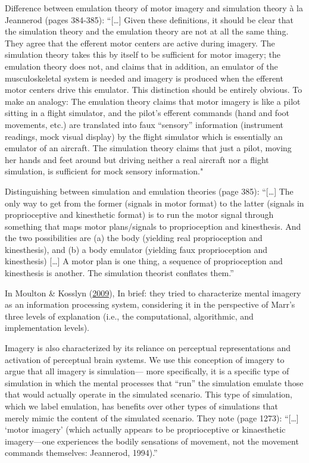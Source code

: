 \documentclass[a4paper,12pt,twoside,openright,oldfontcommands]{memoir}
\begin{document}
Difference between emulation theory of motor imagery and simulation theory à la Jeannerod (pages 384-385): \enquote{{[}\ldots{]} Given these definitions, it should be clear that the simulation theory and the emulation theory are not at all the same thing. They agree that the efferent motor centers are active during imagery. The simulation theory takes this by itself to be sufficient for motor imagery; the emulation theory does not, and claims that in addition, an emulator of the musculoskeletal system is needed and imagery is produced when the efferent motor centers drive this emulator. This distinction should be entirely obvious. To make an analogy: The emulation theory claims that motor imagery is like a pilot sitting in a flight simulator, and the pilot's efferent commands (hand and foot movements, etc.) are translated into faux ``sensory} information (instrument readings, mock visual display) by the flight simulator which is essentially an emulator of an aircraft. The simulation theory claims that just a pilot, moving her hands and feet around but driving neither a real aircraft nor a flight simulation, is sufficient for mock sensory information."

Distinguishing between simulation and emulation theories (page 385): \enquote{{[}\ldots{]} The only way to get from the former (signals in motor format) to the latter (signals in proprioceptive and kinesthetic format) is to run the motor signal through something that maps motor plans/signals to proprioception and kinesthesis. And the two possibilities are (a) the body (yielding real proprioception and kinesthesis), and (b) a body emulator (yielding faux proprioception and kinesthesis) {[}\ldots{]} A motor plan is one thing, a sequence of proprioception and kinesthesis is another. The simulation theorist conflates them.}

In Moulton \& Kosslyn (\protect\hyperlink{ref-moulton_imagining_2009}{2009}), In brief: they tried to characterize mental imagery as an information processing system, considering it in the perspective of Marr's three levels of explanation (i.e., the computational, algorithmic, and implementation levels).

Imagery is also characterized by its reliance on perceptual representations and activation of perceptual brain systems. We use this conception of imagery to argue that all imagery is simulation--- more specifically, it is a specific type of simulation in which the mental processes that \enquote{run} the simulation emulate those that would actually operate in the simulated scenario. This type of simulation, which we label emulation, has benefits over other types of simulations that merely mimic the content of the simulated scenario.
They note (page 1273): \enquote{{[}\ldots{]} \enquote{motor imagery} (which actually appears to be proprioceptive or kinaesthetic imagery---one experiences the bodily sensations of movement, not the movement commands themselves: Jeannerod, 1994).}
\end{document}
